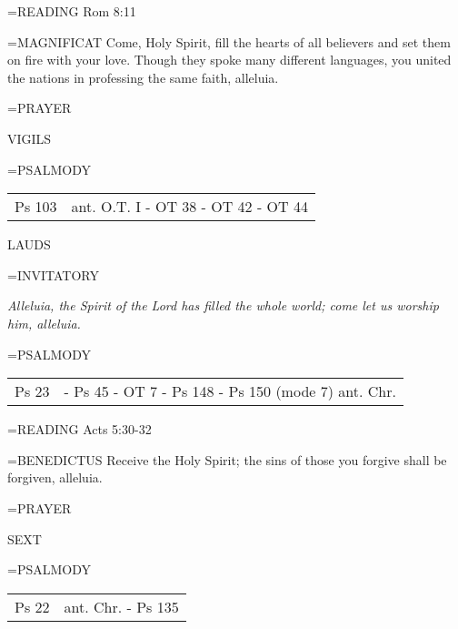 \hangindent=\parindent \small{READING}	Rom 8:11 \textbf{\\}

\hangindent=\parindent \small{MAGNIFICAT 	Come, Holy Spirit, fill the hearts of all believers and set them on fire with your love. Though they spoke many different languages, you united the nations in professing the same faith, alleluia.\\}

\hangindent=\parindent \small{PRAYER 	}

\begin{flushleft}\normalsize VIGILS\\\end{flushleft}
\hangindent=\parindent \small{PSALMODY}
\begin{center}
\begin{tabular}{ l l }
Ps 103 &  ant. O.T. I - OT 38 - OT 42 - OT 44\\
\end{tabular}
\end{center}		

\begin{flushleft}\normalsize LAUDS\\\end{flushleft}
\hangindent=\parindent \small{INVITATORY}
\begin{center}
\textit{Alleluia, the Spirit of the Lord has filled the whole world; come let us worship him, alleluia.\\}
\end{center}

\hangindent=\parindent \small{PSALMODY}
\begin{center}
\begin{tabular}{ l l }
Ps 23 &  - Ps 45 - OT 7 - Ps 148 - Ps 150 (mode 7) ant. Chr.\\
\end{tabular}
\end{center}		

\hangindent=\parindent \small{READING}	Acts 5:30-32 \textbf{\\}

\hangindent=\parindent \small{BENEDICTUS 	Receive the Holy Spirit; the sins of those you forgive shall be forgiven, alleluia.\\}

\hangindent=\parindent \small{PRAYER 	}

\begin{flushleft}\normalsize SEXT\\\end{flushleft}
\hangindent=\parindent \small{PSALMODY}
\begin{center}
\begin{tabular}{ l l }
Ps 22 &  ant. Chr. - Ps 135\\
\end{tabular}
\end{center}		

